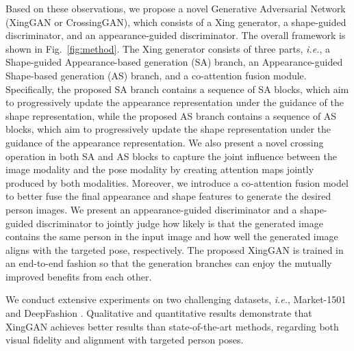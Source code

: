 \documentclass[runningheads]{llncs}
\begin{document}
Based on these observations, we propose a novel Generative Adversarial Network (XingGAN or CrossingGAN), which consists of a Xing generator, a shape-guided discriminator, and an appearance-guided discriminator.
The overall framework is shown in Fig.~\ref{fig:method}. The Xing generator consists of three parts, \emph{i.e.}, a Shape-guided Appearance-based generation (SA) branch, an Appearance-guided Shape-based generation (AS) branch, and a co-attention fusion module.
Specifically, the proposed SA branch contains a sequence of SA blocks, which aim to progressively update the appearance representation under the guidance of the shape representation, while the proposed AS branch contains a sequence of AS blocks, which aim to progressively update the shape representation under the guidance of the appearance representation. 
We also present a novel crossing operation in both SA and AS blocks to capture the joint influence between the image modality and the pose modality by creating attention maps jointly produced by both modalities. 
Moreover, we introduce a co-attention fusion model to better fuse the final appearance and shape features to generate the desired person images.
We present an appearance-guided discriminator and a shape-guided discriminator to jointly judge how likely is that the generated image contains the same person in the input image and how well the generated image aligns with the targeted pose, respectively.
The proposed XingGAN is trained in an end-to-end fashion so that the generation branches can enjoy the mutually improved benefits from each other.

We conduct extensive experiments on two challenging datasets, \emph{i.e.}, Market-1501 \cite{zheng2015scalable} and DeepFashion \cite{liu2016deepfashion}.
Qualitative and quantitative results demonstrate that XingGAN achieves better results than state-of-the-art methods, regarding both visual fidelity and alignment with targeted person poses. 
\end{document}

